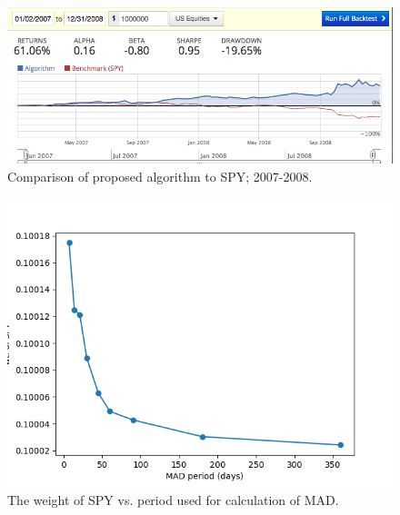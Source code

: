 \documentclass{article}
\begin{document}
\begin{figure}
\includegraphics[scale=0.5,bb=0 0 640 480]{figures/crash_period_mfd_macd.png}
\caption{Comparison of proposed algorithm to SPY; 2007-2008.}
\label{fig:backtest-2007-2008}
\end{figure}

\begin{figure}
\includegraphics[scale=0.9,bb=0 0 640 480]{figures/mad-sensitivity-period-SPY.png}
\caption{The weight of SPY vs. period used for calculation of MAD.}
\label{fig:mad-period-sensitivity}
\end{figure}

\clearpage



\end{document}
